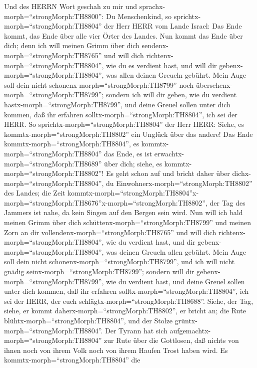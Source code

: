  Und des HERRN Wort geschah zu mir und
sprachx-morph=``strongMorph:TH8800'':  Du Menschenkind, so
sprichtx-morph=``strongMorph:TH8804'' der Herr HERR vom Lande Israel:
Das Ende kommt, das Ende über alle vier Örter des Landes. 
Nun kommt das Ende über dich; denn ich will meinen Grimm über dich
sendenx-morph=``strongMorph:TH8765'' und will dich
richtenx-morph=``strongMorph:TH8804'', wie du es verdient hast, und will
dir gebenx-morph=``strongMorph:TH8804'', was allen deinen Greueln
gebührt.  Mein Auge soll dein nicht
schonenx-morph=``strongMorph:TH8799'' noch
übersehenx-morph=``strongMorph:TH8799''; sondern ich will dir geben, wie
du verdient hastx-morph=``strongMorph:TH8799'', und deine Greuel sollen
unter dich kommen, daß ihr erfahren solltx-morph=``strongMorph:TH8804'',
ich sei der HERR.  So sprichtx-morph=``strongMorph:TH8804''
der Herr HERR: Siehe, es kommtx-morph=``strongMorph:TH8802'' ein Unglück
über das andere!  Das Ende
kommtx-morph=``strongMorph:TH8804'', es
kommtx-morph=``strongMorph:TH8804'' das Ende, es ist
erwachtx-morph=``strongMorph:TH8689'' über dich; siehe, es
kommtx-morph=``strongMorph:TH8802''!  Es geht schon auf und
bricht daher über dichx-morph=``strongMorph:TH8804'', du
Einwohnerx-morph=``strongMorph:TH8802'' des Landes; die Zeit
kommtx-morph=``strongMorph:TH8804''\textbar x-morph=``strongMorph:TH8676''x-morph=``strongMorph:TH8802'',
der Tag des Jammers ist nahe, da kein Singen auf den Bergen sein wird.
 Nun will ich bald meinen Grimm über dich
schüttenx-morph=``strongMorph:TH8799'' und meinen Zorn an dir
vollendenx-morph=``strongMorph:TH8765'' und will dich
richtenx-morph=``strongMorph:TH8804'', wie du verdient hast, und dir
gebenx-morph=``strongMorph:TH8804'', was deinen Greueln allen gebührt.
 Mein Auge soll dein nicht
schonenx-morph=``strongMorph:TH8799'', und ich will nicht gnädig
seinx-morph=``strongMorph:TH8799''; sondern will dir
gebenx-morph=``strongMorph:TH8799'', wie du verdient hast, und deine
Greuel sollen unter dich kommen, daß ihr erfahren
solltx-morph=``strongMorph:TH8804'', ich sei der HERR, der euch
schlägtx-morph=``strongMorph:TH8688''.  Siehe, der Tag,
siehe, er kommt daherx-morph=``strongMorph:TH8802'', er bricht an; die
Rute blühtx-morph=``strongMorph:TH8804'', und der Stolze
grüntx-morph=``strongMorph:TH8804''.  Der Tyrann hat sich
aufgemachtx-morph=``strongMorph:TH8804'' zur Rute über die Gottlosen,
daß nichts von ihnen noch von ihrem Volk noch von ihrem Haufen Trost
haben wird.  Es kommtx-morph=``strongMorph:TH8804'' die
